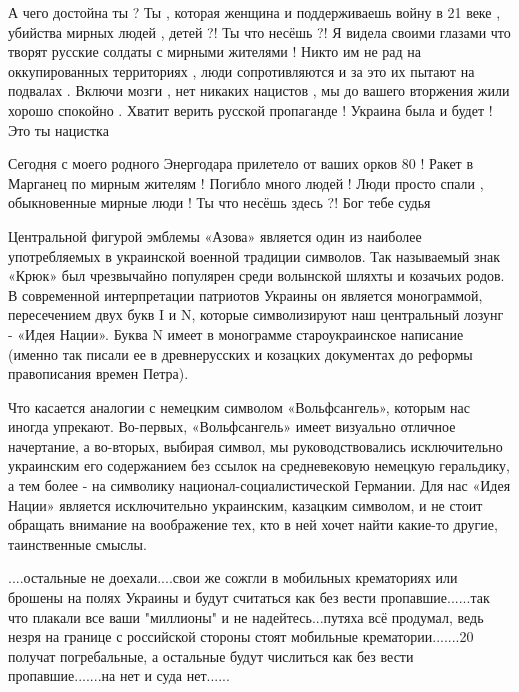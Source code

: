 {А чего достойна ты ? Ты , которая женщина и поддерживаешь войну в 21 веке ,
убийства мирных людей , детей ?! Ты что несёшь ?! Я видела своими глазами что
творят русские солдаты с мирными жителями ! Никто им не рад на оккупированных
территориях , люди сопротивляются и за это их пытают на подвалах . Включи мозги
, нет никаких нацистов , мы до вашего вторжения жили хорошо спокойно . Хватит
верить русской пропаганде ! Украина была и будет ! Это ты нацистка


Сегодня с моего родного Энергодара прилетело от ваших орков 80 ! Ракет в
Марганец по мирным жителям ! Погибло много людей ! Люди просто спали ,
обыкновенные мирные люди ! Ты что несёшь здесь ?! Бог тебе судья


Центральной фигурой эмблемы «Азова» является один из наиболее употребляемых в
украинской военной традиции символов. Так называемый знак «Крюк» был
чрезвычайно популярен среди волынской шляхты и козачьих родов. В современной
интерпретации патриотов Украины он является монограммой, пересечением двух букв
I и N, которые символизируют наш центральный лозунг - «Идея Нации». Буква N
имеет в монограмме староукраинское написание (именно так писали ее в
древнерусских и козацких документах до реформы правописания времен Петра).

Что касается аналогии с немецким символом «Вольфсангель», которым нас иногда
упрекают. Во-первых, «Вольфсангель» имеет визуально отличное начертание, а
во-вторых, выбирая символ, мы руководствовались исключительно украинским его
содержанием без ссылок на средневековую немецкую геральдику, а тем более - на
символику национал-социалистической Германии. Для нас «Идея Нации» является
исключительно украинским, казацким символом, и не стоит обращать внимание на
воображение тех, кто в ней хочет найти какие-то другие, таинственные смыслы.


....остальные не доехали....свои же сожгли в мобильных крематориях или брошены
на полях Украины и будут считаться как без вести пропавшие......так что плакали
все ваши "миллионы" и не надейтесь...путяха всё продумал, ведь незря на границе
с российской стороны стоят мобильные крематории.......20%
получат погребальные, а остальные будут числиться как без вести
пропавшие.......на нет и суда нет......

}
